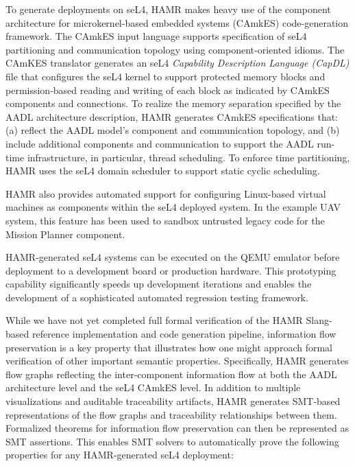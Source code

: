 To generate deployments on seL4, HAMR makes heavy use of the
component architecture for microkernel-based embedded systems
(CAmkES) code-generation framework.   The CAmkES input
language supports specification
of seL4 partitioning and communication topology using
component-oriented idioms.  The CAmKES translator generates an
seL4 \emph{Capability Description Language (CapDL)} file that
configures the seL4 kernel to support protected memory blocks
and permission-based reading and writing of each block as
indicated by CAmkES components and connections.
To realize the memory separation specified by the AADL
architecture description, HAMR generates CAmkES specifications
that: (a) reflect the AADL model's component and communication
topology, and (b) include additional components and communication
to support the AADL run-time infrastructure, in particular,
thread scheduling.
To enforce time partitioning, HAMR uses the seL4 domain
scheduler to support static cyclic scheduling. 

HAMR also provides automated support for configuring Linux-based
virtual machines as components within the seL4 deployed system. 
In the example UAV system, this feature has been used to sandbox untrusted legacy code
for the Mission Planner component.


HAMR-generated seL4 systems can be executed on the QEMU emulator
before deployment to a development board or
production hardware.  This prototyping capability significantly speeds up development
iterations and enables the development of a sophisticated
automated regression testing framework.

While we have not yet completed full formal verification of
the HAMR Slang-based reference implementation and code generation
pipeline, information flow preservation is a key property that 
illustrates how one might approach formal verification of 
other important semantic properties.
Specifically, HAMR generates flow graphs reflecting the
inter-component information flow at both the AADL architecture
level and the seL4 CAmkES level.  In addition to multiple
visualizations and auditable traceability artifacts, HAMR
generates SMT-based representations of the flow graphs and
traceability relationships between them.  Formalized
theorems for information flow preservation can then be represented as
SMT assertions.  This enables SMT solvers to automatically prove
the following properties for any HAMR-generated seL4 deployment:

